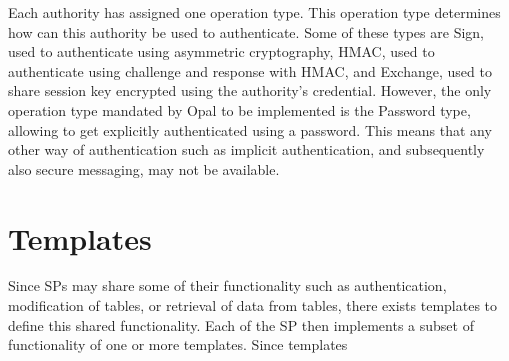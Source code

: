 Each authority has assigned one operation type. This operation type determines how can this authority be used to authenticate.
Some of these types are Sign, used to authenticate using asymmetric cryptography, HMAC, used to authenticate using challenge and response with HMAC, and Exchange, used to share session key encrypted using the authority's credential.
However, the only operation type mandated by Opal to be implemented is the Password type, allowing to get explicitly authenticated using a password. This means that any other way of authentication such as implicit authentication, and subsequently also secure messaging, may not be available.


\section{Templates}
\label{templates}

Since SPs may share some of their functionality such as authentication, modification of tables, or retrieval of data from tables, there exists templates to define this shared functionality. Each of the SP then implements a subset of functionality of one or more templates. Since templates 

